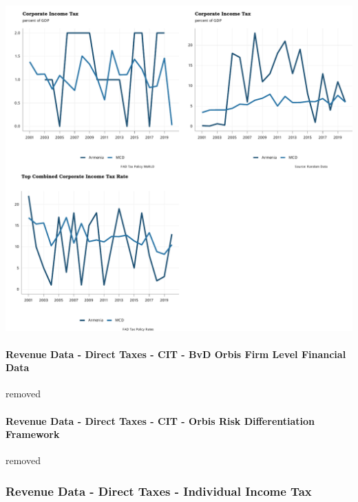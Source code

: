 \documentclass[
]{article}
\begin{document}
\begin{center}\includegraphics{RandomData_MCD__files/figure-latex/weoDirectTaxesCorporate-1} \end{center}

\newpage

\hypertarget{revenue-data---direct-taxes---cit---bvd-orbis-firm-level-financial-data}{%
\paragraph{Revenue Data - Direct Taxes - CIT - BvD Orbis Firm Level
Financial
Data}\label{revenue-data---direct-taxes---cit---bvd-orbis-firm-level-financial-data}}

removed

\newpage

\hypertarget{revenue-data---direct-taxes---cit---orbis-risk-differentiation-framework}{%
\paragraph{Revenue Data - Direct Taxes - CIT - Orbis Risk
Differentiation
Framework}\label{revenue-data---direct-taxes---cit---orbis-risk-differentiation-framework}}

removed

\newpage

\hypertarget{revenue-data---direct-taxes---individual-income-tax}{%
\subsubsection{Revenue Data - Direct Taxes - Individual Income
Tax}\label{revenue-data---direct-taxes---individual-income-tax}}
\end{document}
